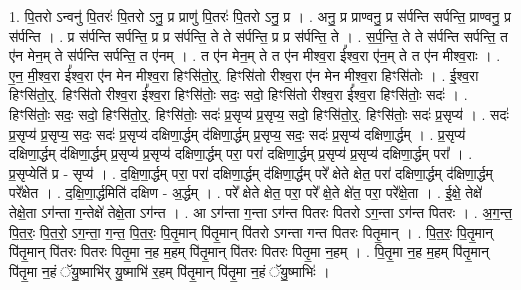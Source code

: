 \documentclass[17pt]{extarticle}
\begin{document}
1. पि॒तरो ऽन्वनु॑ पि॒तरः॑ पि॒तरो ऽनु॒ प्र प्राणु॑ पि॒तरः॑ पि॒तरो ऽनु॒ प्र । . अनु॒ प्र प्राण्वनु॒ प्र स॑र्पन्ति सर्पन्ति॒ प्राण्वनु॒ प्र स॑र्पन्ति । . प्र स॑र्पन्ति सर्पन्ति॒ प्र प्र स॑र्पन्ति॒ ते ते स॑र्पन्ति॒ प्र प्र स॑र्पन्ति॒ ते । . स॒र्प॒न्ति॒ ते ते स॑र्पन्ति सर्पन्ति॒ त ए॑न मेन॒म् ते स॑र्पन्ति सर्पन्ति॒ त ए॑नम् । . त ए॑न मेन॒म् ते त ए॑न मीश्व॒रा ई᳚श्व॒रा ए॑न॒म् ते त ए॑न मीश्व॒राः । . ए॒न॒ मी॒श्व॒रा ई᳚श्व॒रा ए॑न मेन मीश्व॒रा हिꣳसि॑तो॒र्॒. हिꣳसि॑तो रीश्व॒रा ए॑न मेन मीश्व॒रा हिꣳसि॑तोः । . ई॒श्व॒रा हिꣳसि॑तो॒र्॒. हिꣳसि॑तो रीश्व॒रा ई᳚श्व॒रा हिꣳसि॑तोः॒ सदः॒ सदो॒ हिꣳसि॑तो रीश्व॒रा ई᳚श्व॒रा हिꣳसि॑तोः॒ सदः॑ । . हिꣳसि॑तोः॒ सदः॒ सदो॒ हिꣳसि॑तो॒र्॒. हिꣳसि॑तोः॒ सदः॑ प्र॒सृप्य॑ प्र॒सृप्य॒ सदो॒ हिꣳसि॑तो॒र्॒. हिꣳसि॑तोः॒ सदः॑ प्र॒सृप्य॑ । . सदः॑ प्र॒सृप्य॑ प्र॒सृप्य॒ सदः॒ सदः॑ प्र॒सृप्य॑ दक्षिणा॒र्द्धम् द॑क्षिणा॒र्द्धम् प्र॒सृप्य॒ सदः॒ सदः॑ प्र॒सृप्य॑ दक्षिणा॒र्द्धम् । . प्र॒सृप्य॑ दक्षिणा॒र्द्धम् द॑क्षिणा॒र्द्धम् प्र॒सृप्य॑ प्र॒सृप्य॑ दक्षिणा॒र्द्धम् परा॒ परा॑ दक्षिणा॒र्द्धम् प्र॒सृप्य॑ प्र॒सृप्य॑ दक्षिणा॒र्द्धम् परा᳚ । . प्र॒सृप्येति॑ प्र - सृप्य॑ । . द॒क्षि॒णा॒र्द्धम् परा॒ परा॑ दक्षिणा॒र्द्धम् द॑क्षिणा॒र्द्धम् परे᳚ क्षेते क्षेत॒ परा॑ दक्षिणा॒र्द्धम् द॑क्षिणा॒र्द्धम् परे᳚क्षेत । . द॒क्षि॒णा॒र्द्धमिति॑ दक्षिण - अ॒र्द्धम् । . परे᳚ क्षेते क्षेत॒ परा॒ परे᳚ क्षे॒ते क्षे॑त॒ परा॒ परे᳚क्षे॒ता । . ई॒क्षे॒ तेक्षे॑ तेक्षे॒ता ऽग॑न्ता ग॒न्तेक्षे॑ तेक्षे॒ता ऽग॑न्त । . आ ऽग॑न्ता ग॒न्ता ऽग॑न्त पितरः पितरो ऽग॒न्ता ऽग॑न्त पितरः । . अ॒ग॒न्त॒ पि॒त॒रः॒ पि॒त॒रो॒ ऽग॒न्ता॒ ग॒न्त॒ पि॒त॒रः॒ पि॒तृ॒मान् पि॑तृ॒मान् पि॑तरो ऽगन्ता गन्त पितरः पितृ॒मान् । . पि॒त॒रः॒ पि॒तृ॒मान् पि॑तृ॒मान् पि॑तरः पितरः पितृ॒मा न॒ह म॒हम् पि॑तृ॒मान् पि॑तरः पितरः पितृ॒मा न॒हम् । . पि॒तृ॒मा न॒ह म॒हम् पि॑तृ॒मान् पि॑तृ॒मा न॒हं ॅयु॒ष्माभि॑र् यु॒ष्माभि॑ र॒हम् पि॑तृ॒मान् पि॑तृ॒मा न॒हं ॅयु॒ष्माभिः॑ । \newline
\end{document}
